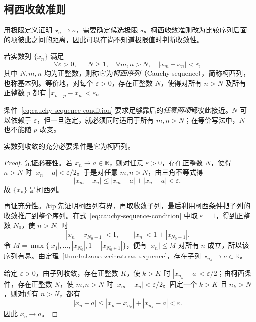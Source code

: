 \subsection{柯西收敛准则}
\label{subsec:cauchy-convergence-criterion}

用极限定义证明 $x_n\to a$，需要确定候选极限 $a$。柯西收敛准则改为比较序列后面的项彼此之间的距离，因此可以在尚不知道极限值时判断收敛性。

\begin{definition}
\label{def:cauchy-sequence}
若实数列 $\{x_n\}$ 满足
\begin{equation}
    \forall\varepsilon>0,\quad\exists N\geq1,\quad
    \forall m,n>N,\quad |x_m-x_n|<\varepsilon,
    \label{eq:cauchy-sequence-condition}
\end{equation}
其中 $N,m,n$ 均为正整数，则称它为\emph{柯西序列}（Cauchy sequence），简称柯西列，也称基本列。等价地，对每个 $\varepsilon>0$，存在正整数 $N$，使得对所有 $n>N$ 及所有正整数 $p$ 都有 $|x_{n+p}-x_n|<\varepsilon$。
\end{definition}

条件~\eqref{eq:cauchy-sequence-condition} 要求足够靠后的\emph{任意两项}都彼此接近。$N$ 可以依赖于 $\varepsilon$，但一旦选定，就必须同时适用于所有 $m,n>N$；在等价写法中，$N$ 也不能随 $p$ 改变。

\begin{theorem}[柯西收敛准则]
\label{thm:cauchy-convergence-criterion}
实数列收敛的充分必要条件是它为柯西列。
\end{theorem}

\begin{proof}
先证必要性。若 $x_n\to a\in\mathbb{R}$，则对任意 $\varepsilon>0$，存在正整数 $N$，使得 $n>N$ 时 $|x_n-a|<\varepsilon/2$。于是对任意 $m,n>N$，由三角不等式得
\[
    |x_m-x_n|\leq|x_m-a|+|x_n-a|<\varepsilon,
\]
故 $\{x_n\}$ 是柯西列。

再证充分性。\emph[tip]{先证明柯西列有界，再取收敛子列，最后利用柯西条件把子列的收敛推广到整个序列。}在式~\eqref{eq:cauchy-sequence-condition} 中取 $\varepsilon=1$，得到正整数 $N_0$，使 $n>N_0$ 时
\[
    |x_n-x_{N_0+1}|<1,
    \qquad |x_n|<1+|x_{N_0+1}|.
\]
令 $M=\max\{|x_1|,\ldots,|x_{N_0}|,1+|x_{N_0+1}|\}$，便有 $|x_n|\leq M$ 对所有 $n$ 成立，所以该序列有界。由定理~\ref{thm:bolzano-weierstrass-sequence}，存在子列 $x_{n_k}\to a\in\mathbb{R}$。

给定 $\varepsilon>0$，由子列收敛，存在正整数 $K$，使 $k>K$ 时 $|x_{n_k}-a|<\varepsilon/2$；由柯西条件，存在正整数 $N$，使 $m,n>N$ 时 $|x_m-x_n|<\varepsilon/2$。固定一个 $k>K$ 且 $n_k>N$，则对所有 $n>N$，都有
\[
    |x_n-a|\leq|x_n-x_{n_k}|+|x_{n_k}-a|<\varepsilon.
\]
因此 $x_n\to a$。
\end{proof}

